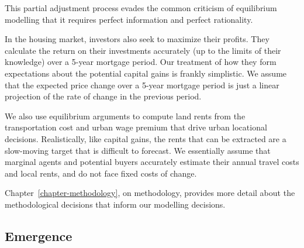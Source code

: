 This partial adjustment process evades the common criticism of equilibrium modelling that it requires perfect information and perfect rationality.  

In the housing market, investors also seek to maximize their profits. They calculate the return on their investments accurately (up to the limits of their knowledge) over a 5-year mortgage period. Our treatment of how they form expectations about the potential capital gains is frankly simplistic. We assume that the expected price change over a 5-year mortgage period is just a linear projection of the rate of change in the previous period.  

We also use equilibrium arguments to compute land rents from the transportation cost and urban wage premium that drive urban locational decisions. Realistically, like capital gains, the rents that can be extracted are a slow-moving target that is difficult to forecast. We essentially assume that marginal agents and potential buyers accurately estimate their annual travel costs and local rents, and do not face fixed costs of change.   %

Chapter~\ref{chapter-methodology}, on methodology, provides more detail about the methodological decisions that inform our modelling decisions. 


\subsection{Emergence}



